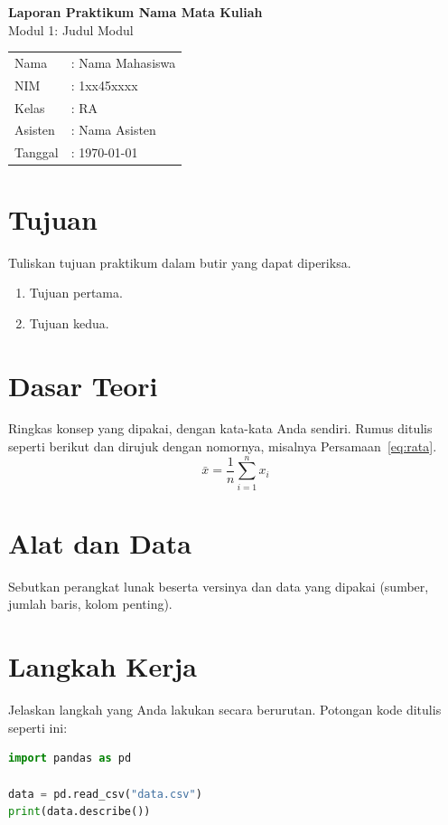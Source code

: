 \documentclass[12pt,a4paper]{article}
\newcommand{\matakuliah}{Nama Mata Kuliah}
\newcommand{\modul}{Modul 1: Judul Modul}
\newcommand{\namamahasiswa}{Nama Mahasiswa}
\newcommand{\nim}{1xx45xxxx}
\newcommand{\kelas}{RA}
\newcommand{\asisten}{Nama Asisten}
\begin{document}
\begin{center}
	{\Large\bfseries Laporan Praktikum \matakuliah}\\[1ex]
	{\large \modul}\\[3ex]
	\begin{tabular}{ll}
		Nama    & : \namamahasiswa \\
		NIM     & : \nim \\
		Kelas   & : \kelas \\
		Asisten & : \asisten \\
		Tanggal & : \today \\
	\end{tabular}
\end{center}

\section{Tujuan}
Tuliskan tujuan praktikum dalam butir yang dapat diperiksa.
\begin{enumerate}
	\item Tujuan pertama.
	\item Tujuan kedua.
\end{enumerate}

\section{Dasar Teori}
Ringkas konsep yang dipakai, dengan kata-kata Anda sendiri. Rumus ditulis seperti
berikut dan dirujuk dengan nomornya, misalnya Persamaan~\ref{eq:rata}.
\begin{equation}
	\bar{x} = \frac{1}{n} \sum_{i=1}^{n} x_i
	\label{eq:rata}
\end{equation}

\section{Alat dan Data}
Sebutkan perangkat lunak beserta versinya dan data yang dipakai (sumber, jumlah baris,
kolom penting).

\section{Langkah Kerja}
Jelaskan langkah yang Anda lakukan secara berurutan. Potongan kode ditulis seperti ini:
\begin{lstlisting}[language=Python, caption={Membaca data}]
import pandas as pd

data = pd.read_csv("data.csv")
print(data.describe())
\end{lstlisting}
\end{document}

